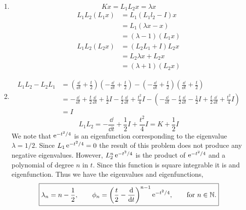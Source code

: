 \begin{Solution}
  \begin{enumerate}
  \item
    \[
    K x = L_1 L_2 x = \lambda x
    \]
    \begin{align*}
      L_1 L_2 ( L_1 x )
      &= L_1 ( L_1 l_2 - I ) x \\
      &= L_1 ( \lambda x - x ) \\
      &= (\lambda - 1) (L_1 x)
    \end{align*}
    \begin{align*}
      L_1 L_2 ( L_2 x )
      &= ( L_2 L_1 + I ) L_2 x \\
      &= L_2 \lambda x + L_2 x \\
      &= (\lambda + 1) (L_2 x)
    \end{align*}
  \item
    \begin{align*}
      L_1 L_2 - L_2 L_1 
      &= \left( \frac{\dd}{\dd t} + \frac{t}{2} \right)
      \left( - \frac{\dd}{\dd t} + \frac{t}{2} \right)
      -  \left( - \frac{\dd}{\dd t} + \frac{t}{2} \right)
      \left( \frac{\dd}{\dd t} + \frac{t}{2} \right) \\
      &= - \frac{\dd}{\dd t} + \frac{t}{2} \frac{\dd}{\dd t} + \frac{1}{2} I 
      - \frac{t}{2} \frac{\dd}{\dd t} + \frac{t^2}{4} I
      - \left( - \frac{\dd}{\dd t} - \frac{t}{2} \frac{\dd}{\dd t} - \frac{1}{2} I 
        + \frac{t}{2} \frac{\dd}{\dd t} + \frac{t^2}{4} I \right) \\
      &= I
    \end{align*}
    \[
    L_1 L_2 = - \frac{\dd}{\dd t} + \frac{1}{2} I + \frac{t^2}{4} I
    = K + \frac{1}{2} I
    \]
    We note that $\mathop{\mathrm{e}}\nolimits^{-t^2 / 4}$ is an eigenfunction corresponding to 
    the eigenvalue $\lambda = 1/2$.   Since $L_1 \mathop{\mathrm{e}}\nolimits^{-t^2 / 4} = 0$ the result
    of this problem does not produce any negative eigenvalues.  However,
    $L_2^n \mathop{\mathrm{e}}\nolimits^{-t^2 / 4}$ is the product of $\mathop{\mathrm{e}}\nolimits^{-t^2 / 4}$ and a  polynomial 
    of degree $n$ in $t$.  Since this function is square integrable it is 
    and eigenfunction.  Thus we have the eigenvalues and eigenfunctions,
    \[
    \boxed{
      \lambda_n = n - \frac{1}{2}, \qquad
      \phi_n = \left( \frac{t}{2} - \frac{\mathrm{d}}{\mathrm{d} t} \right)^{n-1} \mathop{\mathrm{e}}\nolimits^{-t^2 / 4}, \qquad
      \mathrm{for}\ n \in \mathbb{N}.
      }
    \]
  \end{enumerate}
\end{Solution}



